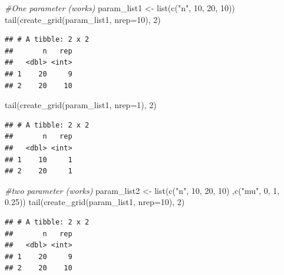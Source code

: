\documentclass[11pt,a4paper]{article}
\newenvironment{Shaded}{\begin{snugshade}}{\end{snugshade}}
\newcommand{\AttributeTok}[1]{\textcolor[rgb]{0.77,0.63,0.00}{#1}}
\newcommand{\CommentTok}[1]{\textcolor[rgb]{0.56,0.35,0.01}{\textit{#1}}}
\newcommand{\DecValTok}[1]{\textcolor[rgb]{0.00,0.00,0.81}{#1}}
\newcommand{\FloatTok}[1]{\textcolor[rgb]{0.00,0.00,0.81}{#1}}
\newcommand{\FunctionTok}[1]{\textcolor[rgb]{0.00,0.00,0.00}{#1}}
\newcommand{\NormalTok}[1]{#1}
\newcommand{\OtherTok}[1]{\textcolor[rgb]{0.56,0.35,0.01}{#1}}
\newcommand{\StringTok}[1]{\textcolor[rgb]{0.31,0.60,0.02}{#1}}
\begin{document}
\begin{Shaded}
\begin{Highlighting}[]
\CommentTok{\#One parameter (works)}
\NormalTok{param\_list1 }\OtherTok{\textless{}{-}} \FunctionTok{list}\NormalTok{(}\FunctionTok{c}\NormalTok{(}\StringTok{"n"}\NormalTok{, }\DecValTok{10}\NormalTok{, }\DecValTok{20}\NormalTok{, }\DecValTok{10}\NormalTok{))}
\FunctionTok{tail}\NormalTok{(}\FunctionTok{create\_grid}\NormalTok{(param\_list1, }\AttributeTok{nrep=}\DecValTok{10}\NormalTok{), }\DecValTok{2}\NormalTok{)}
\end{Highlighting}
\end{Shaded}

\begin{verbatim}
## # A tibble: 2 x 2
##       n   rep
##   <dbl> <int>
## 1    20     9
## 2    20    10
\end{verbatim}

\begin{Shaded}
\begin{Highlighting}[]
\FunctionTok{tail}\NormalTok{(}\FunctionTok{create\_grid}\NormalTok{(param\_list1, }\AttributeTok{nrep=}\DecValTok{1}\NormalTok{), }\DecValTok{2}\NormalTok{)}
\end{Highlighting}
\end{Shaded}

\begin{verbatim}
## # A tibble: 2 x 2
##       n   rep
##   <dbl> <int>
## 1    10     1
## 2    20     1
\end{verbatim}

\begin{Shaded}
\begin{Highlighting}[]
\CommentTok{\#two parameter (works)}
\NormalTok{param\_list2 }\OtherTok{\textless{}{-}} \FunctionTok{list}\NormalTok{(}\FunctionTok{c}\NormalTok{(}\StringTok{"n"}\NormalTok{, }\DecValTok{10}\NormalTok{, }\DecValTok{20}\NormalTok{, }\DecValTok{10}\NormalTok{)}
\NormalTok{                    ,}\FunctionTok{c}\NormalTok{(}\StringTok{"mu"}\NormalTok{, }\DecValTok{0}\NormalTok{, }\DecValTok{1}\NormalTok{, }\FloatTok{0.25}\NormalTok{))}
\FunctionTok{tail}\NormalTok{(}\FunctionTok{create\_grid}\NormalTok{(param\_list1, }\AttributeTok{nrep=}\DecValTok{10}\NormalTok{), }\DecValTok{2}\NormalTok{)}
\end{Highlighting}
\end{Shaded}

\begin{verbatim}
## # A tibble: 2 x 2
##       n   rep
##   <dbl> <int>
## 1    20     9
## 2    20    10
\end{verbatim}
\end{document}
